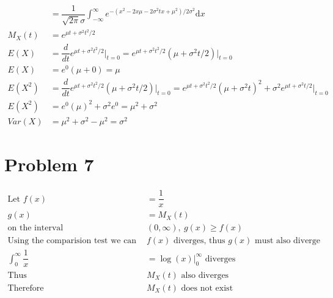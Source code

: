 \documentclass{article}
\newcommand{\dx}{\mathrm{d}x}
\begin{document}
\begin{flushleft}
\begin{enumerate}[(a)]
\begin{align*}
&=\dfrac{1}{\sqrt{2\pi}\sigma}\int_{-\infty}^{\infty}e^{-(x^2-2x\mu-2\sigma^2tx+\mu^2)/2\sigma^2}\dx\\
M_X(t)&=e^{\mu t +\sigma^2t^2/2}\\
E(X)&=\dfrac{d}{dt}e^{\mu t +\sigma^2t^2/2}\bigg|_{t=0}=e^{\mu t +\sigma^2t^2/2}(\mu+\sigma^2 t/2)\bigg|_{t=0}\\
E(X)&=e^0(\mu+0)=\mu\\
E(X^2)&=\dfrac{d}{dt}e^{\mu t +\sigma^2t^2/2}(\mu+\sigma^2 t/2)\bigg|_{t=0}=e^{\mu t +\sigma^2t^2/2}(\mu+\sigma^2t)^2+ \sigma^2e^{\mu t+\sigma^2t/2}\bigg|_{t=0}\\
E(X^2)&=e^0(\mu)^2+\sigma^2e^0=\mu^2+\sigma^2\\
Var(X)&=\mu^2+\sigma^2-\mu^2=\sigma^2
\end{align*}
\end{enumerate}
\pagebreak
\section*{Problem 7}
\begin{align*}
\text{Let } f(x)&=\dfrac{1}{x}\\
g(x)&=M_X(t)\\
\text{on the interval }& (0,\infty), \ g(x)\geq f(x)\\
\text{Using the comparision test we can show } &f(x) \text{ diverges, thus } g(x) \text{ must also diverge}\\
\int_{0}^{\infty}\dfrac{1}{x}&=\log(x)\bigg|_{0}^{\infty} \text{ diverges}\\
\text{Thus }& M_X(t) \text{ also diverges}\\
\text{Therefore }& M_X(t) \text{ does not exist} 
\end{align*}

\end{flushleft}
\end{document}
